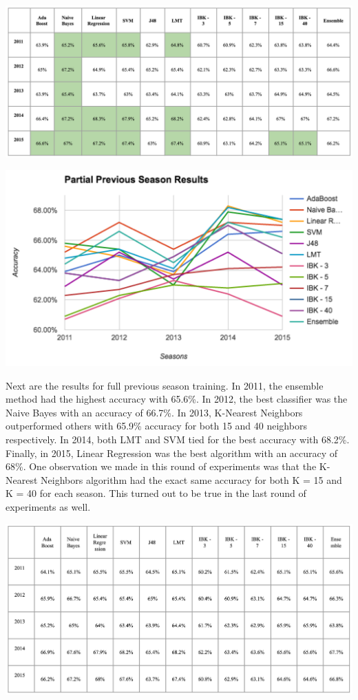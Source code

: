 \documentclass{article}
\begin{document}
\includegraphics[scale=0.405]{images/partialPrevResults.png}

\includegraphics[scale=0.7]{images/partialPreviousGraph.png}

Next are the results for full previous season training. In 2011, the ensemble method had the highest accuracy with 65.6\%. In 2012, the best classifier was the Naive Bayes with an accuracy of 66.7\%. In 2013, K-Nearest Neighbors outperformed others with 65.9\% accuracy for both 15 and 40 neighbors respectively. In 2014, both LMT and SVM tied for the best accuracy with 68.2\%. Finally, in 2015, Linear Regression was the best algorithm with an accuracy of 68\%. One observation we made in this round of experiments was that the K-Nearest Neighbors algorithm had the exact same accuracy for both K = 15 and K = 40 for each season. This turned out to be true in the last round of experiments as well.

\includegraphics[scale=0.405]{images/fullPrevResults.png}
\end{document}
